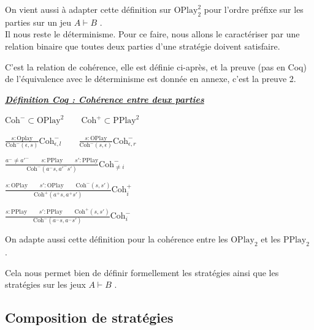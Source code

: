 \documentclass[a4paper,12pt]{article}
\renewenvironment{leftbar}{
  \def\FrameCommand{\vrule width 1pt \hspace{10pt}}
  \MakeFramed {\advance\hsize-\width \FrameRestore}
\setlength{\parskip}{10pt}}
 {\endMakeFramed}
\newenvironment{answer}[1]
{
  \vspace{0.5cm} \noindent \begin{minipage}{\linewidth}
    \textbf{\textit{\uline{#1}}}
    \begin{leftbar}
}
{
    \end{leftbar}\end{minipage}\vspace{0.2cm}
}
\begin{document}
On vient aussi à adapter cette définition sur $\text{OPlay}_2^2$ pour l'ordre
préfixe sur les parties sur un jeu $A\vdash B$ \href{https://ulysse_durand.gitlab.io/stagel3/Codecoq.theories.jeuthese.html\#prefixO2}{\faCode}.\\


Il nous reste le déterminisme. Pour ce faire, nous allons le caractériser par
une relation binaire que toutes deux parties d'une stratégie doivent satisfaire.

C'est la relation de cohérence, elle est définie ci-après, et la preuve (pas
en Coq) de l'équivalence avec le déterminisme est donnée en annexe,
c'est la preuve 2.

\begin{answer}{Définition Coq : Cohérence entre deux parties \href{https://ulysse_durand.gitlab.io/stagel3/Codecoq.theories.strategy.html\#coherentO}{\faCode}}
$\text{Coh}^- \subset \text{OPlay}^2 \qquad \text{Coh}^+ \subset \text{PPlay}^2$

$\frac{s:\text{Oplay}}{\text{Coh}^-(\epsilon,s)} \text{Coh}^-_{\epsilon,l} \qquad
 \frac{s:\text{OPlay}}{\text{Coh}^-(s,\epsilon)} \text{Coh}^-_{\epsilon,r}$

$\frac{a^- \neq a'^- \qquad s:\text{PPlay} \qquad s':\text{PPlay}}
{\text{Coh}^-(a^-s, a'^- s')} \text{Coh}^-_{\neq i}$

$\frac{s : \text{OPlay} \qquad s':\text{OPlay} \qquad \text{Coh}^-(s,s')}
{\text{Coh}^+(a^+s, a^+s')} \text{Coh}^+_i$

$\frac{s : \text{PPlay} \qquad s':\text{PPlay} \qquad \text{Coh}^+(s,s')}
{\text{Coh}^-(a^-s, a^-s')} \text{Coh}^-_i$

\end{answer}

On adapte aussi cette définition pour la cohérence entre les $\text{OPlay}_2$ et les
$\text{PPlay}_2$ \href{https://ulysse_durand.gitlab.io/stagel3/Codecoq.theories.jeuthese.html\#coherentO2}{\faCode}.

Cela nous permet bien de définir formellement les stratégies
\href{https://ulysse_durand.gitlab.io/stagel3/Codecoq.theories.strategy.html#strategy}{\faCode}
ainsi que les stratégies sur les jeux $A\vdash B$
\href{https://ulysse_durand.gitlab.io/stagel3/Codecoq.theories.jeuthese.html#strategy2O}{\faCode}.

\subsection{Composition de stratégies}
\end{document}
